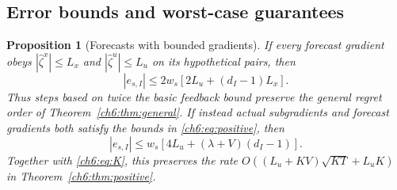 \documentclass[11pt]{article}
\theoremstyle{plain}
\newtheorem{Thm:Proposition}[Thm:Theorem]{Proposition}
\theoremstyle{remark}
\numberwithin{equation}{section}
\begin{document}
\subsection{Error bounds and worst-case guarantees}
\begin{Thm:Proposition}[Forecasts with bounded gradients]\label{ch6:prop:forecast}
If every forecast gradient obeys
$|\widehat\zeta^x|\le L_x$ and $|\widehat\zeta^u|\le L_u$ on its hypothetical
pairs, then
\begin{equation}\label{ch6:eq:forecast-general}
 |e_{s,I}|\le2w_s[2L_u+(d_I-1)L_x].
\end{equation}
Thus steps based on twice the basic feedback bound preserve the general
regret order of Theorem~\ref{ch6:thm:general}.
If instead actual subgradients and forecast gradients both satisfy the bounds in
\eqref{ch6:eq:positive}, then
\begin{equation}\label{ch6:eq:forecast-positive}
 |e_{s,I}|\le w_s[4L_u+(\lambda+V)(d_I-1)].
\end{equation}
Together with \eqref{ch6:eq:K}, this preserves the rate
$O((L_u+KV)\sqrt{KT}+L_uK)$ in Theorem~\ref{ch6:thm:positive}.
\end{Thm:Proposition}
\end{document}
